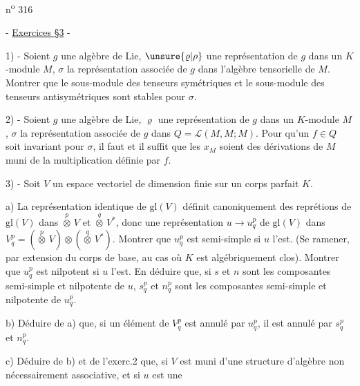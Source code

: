 
\hfill n\textsuperscript{o} 316

- \uline{Exercices  §3} -

1) - Soient $g$ une algèbre de Lie, $\unsure{\varrho|\rho}$ une représentation de $g$ dans un $K$-module $M$, $\sigma$ la représentation associée de $g$ dans l'algèbre tensorielle de $M$. Montrer que le sous-module des tenseurs symétriques et le sous-module des tenseurs antisymétriques sont stables pour $\sigma$.

2) - Soient $g$ une algèbre de Lie, $\varrho$ une représentation de $g$ dans un $K$-module $M$, $\sigma$ la représentation associée de $g$ dans $Q=\mathcal{L}(M,M;M)$. Pour qu'un $f\in Q$ soit invariant pour $\sigma$, il faut et il suffit que les $x_M$ soient des dérivations de $M$ muni de la multiplication définie par $f$.

3) - Soit $V$ un espace vectoriel de dimension finie sur un corps parfait $K$.

a) La représentation identique de $\mathrm{gl}(V)$ définit canoniquement des reprétions de $\mathrm{gl}(V)$ dans $\overset{p}{\otimes}\,V$ et $\overset{q}{\otimes}\,V^*$, donc une représentation $u\longrightarrow u^p_q$ de $\mathrm{gl}(V)$ dans $V^p_q=(\overset{p}{\otimes}\,V)\otimes(\overset{q}{\otimes}\,V^*)$. Montrer que $u^p_q$ est semi-simple si $u$ l'est. (Se ramener, par extension du corps de base, au cas où $K$ est algébriquement clos). Montrer que $u^p_q$ est nilpotent si $u$ l'est. En déduire que, si $s$ et $n$ sont les composantes semi-simple et nilpotente de $u$, $s^p_q$ et $n^p_q$ sont les composantes semi-simple et nilpotente de $u^p_q$.

b) Déduire de a) que, si un élément de $V^p_q$ est annulé par $u^p_q$, il est annulé par $s^p_q$ et $n^p_q$.

c) Déduire de b) et de l'exerc.2 que, si $V$ est muni d'une structure d'algèbre non nécessairement associative, et si $u$ est une
